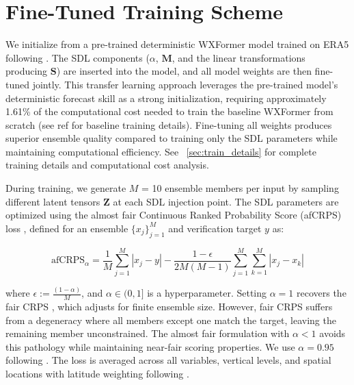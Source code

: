 \documentclass[11pt]{article}
\begin{document}
\section{Fine-Tuned Training Scheme}


We initialize from a pre-trained deterministic WXFormer model trained on ERA5 following \cite{schreck2025}. The SDL components ($\alpha$, $\mathbf{M}$, and the linear transformations producing $\mathbf{S}$) are inserted into the model, and all model weights are then fine-tuned jointly. This transfer learning approach leverages the pre-trained model's deterministic forecast skill as a strong initialization, requiring approximately 1.61\% of the computational cost needed to train the baseline WXFormer from scratch (see ref \cite{schreck2025} for baseline training details). Fine-tuning all weights produces superior ensemble quality compared to training only the SDL parameters while maintaining computational efficiency. See ~\ref{sec:train_details} for complete training details and computational cost analysis.

During training, we generate $M$ = 10 ensemble members per input by sampling different latent tensors $\mathbf{Z}$ at each SDL injection point. The SDL parameters are optimized using the almost fair Continuous Ranked Probability Score (afCRPS) loss \cite{lang2024aifs}, defined for an ensemble $\{x_j\}_{j=1}^M$ and verification target $y$ as:

\begin{equation}
\text{afCRPS}_\alpha = \frac{1}{M}\sum_{j=1}^M |x_j - y| - \frac{1-\epsilon}{2M(M-1)}\sum_{j=1}^M\sum_{k=1}^M |x_j - x_k|
\label{eq:afcrps}
\end{equation}

where $\epsilon := \frac{(1-\alpha)}{M}$, and $\alpha \in (0,1]$ is a hyperparameter. Setting $\alpha = 1$ recovers the fair CRPS \cite{ferro2013fair}, which adjusts for finite ensemble size. However, fair CRPS suffers from a degeneracy where all members except one match the target, leaving the remaining member unconstrained. The almost fair formulation with $\alpha < 1$ avoids this pathology while maintaining near-fair scoring properties. We use $\alpha = 0.95$ following \cite{lang2024aifs}. The loss is averaged across all variables, vertical levels, and spatial locations with latitude weighting following \cite{schreck2025}.
\end{document}
